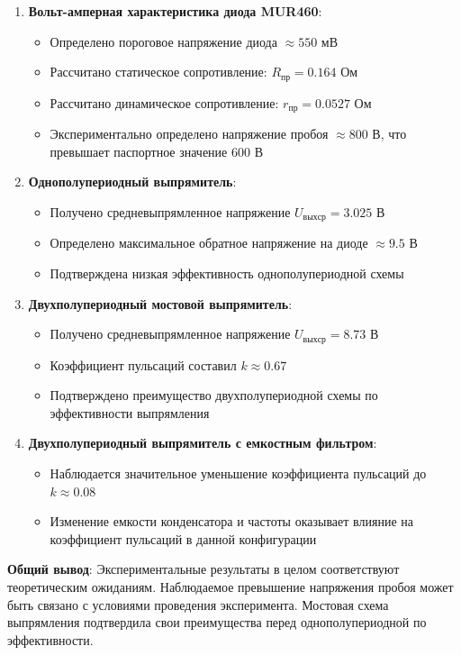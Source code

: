 \begin{enumerate}
    \item \textbf{Вольт-амперная характеристика диода MUR460}:
    \begin{itemize}
        \item Определено пороговое напряжение диода $\approx 550$ мВ
        \item Рассчитано статическое сопротивление: $R_{пр} = 0.164$ Ом
        \item Рассчитано динамическое сопротивление: $r_{пр} = 0.0527$ Ом
        \item Экспериментально определено напряжение пробоя $\approx 800$ В, что превышает паспортное значение 600 В
    \end{itemize}
    
    \item \textbf{Однополупериодный выпрямитель}:
    \begin{itemize}
        \item Получено средневыпрямленное напряжение $U_{вых ср} = 3.025$ В
        \item Определено максимальное обратное напряжение на диоде $\approx 9.5$ В
        \item Подтверждена низкая эффективность однополупериодной схемы
    \end{itemize}
    
    \item \textbf{Двухполупериодный мостовой выпрямитель}:
    \begin{itemize}
        \item Получено средневыпрямленное напряжение $U_{вых ср} = 8.73$ В
        \item Коэффициент пульсаций составил $k \approx 0.67$
        \item Подтверждено преимущество двухполупериодной схемы по эффективности выпрямления
    \end{itemize}
    
    \item \textbf{Двухполупериодный выпрямитель с емкостным фильтром}:
    \begin{itemize}
        \item Наблюдается значительное уменьшение коэффициента пульсаций до $k \approx 0.08$
        \item Изменение емкости конденсатора и частоты оказывает влияние на коэффициент пульсаций в данной конфигурации
    \end{itemize}
\end{enumerate}

\textbf{Общий вывод}: Экспериментальные результаты в целом соответствуют теоретическим ожиданиям. Наблюдаемое превышение напряжения пробоя может быть связано с условиями проведения эксперимента. Мостовая схема выпрямления подтвердила свои преимущества перед однополупериодной по эффективности.